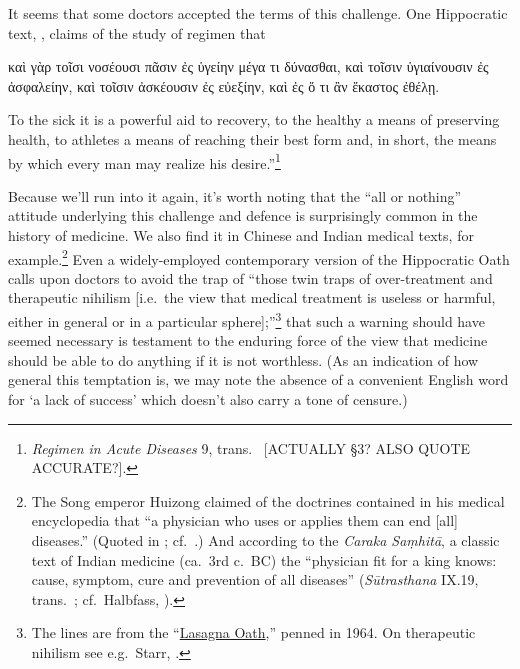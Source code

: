 \documentclass[11pt,letterpaper,oneside]{amsart} %
\begin{document}
It seems that some doctors accepted the terms of this challenge. One Hippocratic text, , claims of the study of regimen that\begin{squote}καὶ γὰρ τοῖσι νοσέουσι πᾶσιν ἐς ὑγείην μέγα τι δύνασθαι, καὶ τοῖσιν ὑγιαίνουσιν ἐς ἀσφαλείην, καὶ τοῖσιν ἀσκέουσιν ἐς εὐεξίην, καὶ ἐς ὅ τι ἂν ἕκαστος ἐθέλῃ.

\vspace{0.05in}

\noindent To the sick it is a powerful aid to recovery, to the healthy a means of preserving health, to athletes a means of reaching their best form and, in short, the means by which every man may realize his desire.''\footnote{\emph{Regimen in Acute Diseases} 9, trans.\  [ACTUALLY \S3? ALSO QUOTE ACCURATE?].}\end{squote}Because we'll run into it again, it's worth noting that the ``all or nothing'' attitude underlying this challenge and defence is surprisingly common in the history of medicine. We also find it in Chinese and Indian medical texts, for example.\footnote{The Song emperor Huizong claimed of the doctrines contained in his medical encyclopedia that ``a physician who uses or applies them can end [all] diseases.'' (Quoted in \citet[p.\ 181]{goldschmidt2008evolution}; cf.\ \citet[pp.\ 67--70]{needham2000science}.) And according to the \emph{Caraka Sa\d mhit\=a}, a classic text of Indian medicine (ca.\ 3rd c.\ BC) the ``physician fit for a king knows: cause, symptom, cure and prevention of all diseases'' (\emph{S\=utrasthana} IX.19, trans.\ ; cf.\ Halbfass, \citeyear{halbfass1991therapeutic}).} Even a widely-employed contemporary version of the Hippocratic Oath calls upon doctors to avoid the trap of ``those twin traps of over-treatment and therapeutic nihilism [i.e.\ the view that medical treatment is useless or harmful, either in general or in a particular sphere];''\footnote{The lines are from the ``\href{http://www.pbs.org/wgbh/nova/doctors/oath_modern.html}{Lasagna Oath},'' penned in 1964. On therapeutic nihilism see e.g.\ Starr, \citeyear{starr1976politics}.} that such a warning should have seemed necessary is testament to the enduring force of the view that medicine should be able to do anything if it is not worthless. (As an indication of how general this temptation is, we may note the absence of a convenient English word for `a lack of success' which doesn't also carry a tone of censure.)
\end{document}
